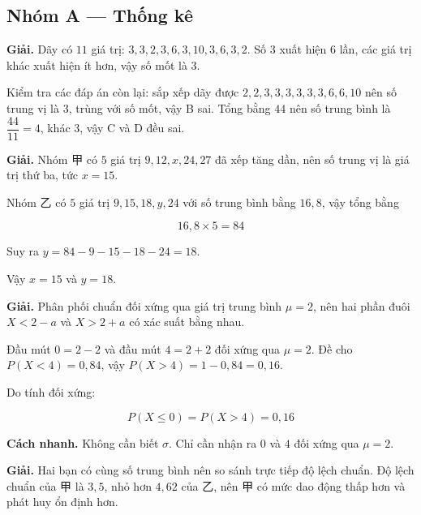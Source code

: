 \documentclass[11pt, a4paper]{article}
\begin{document}

\subsection*{Nhóm A — Thống kê}

\begin{dapan}[1 — Đáp án A]
\textbf{Giải.} Dãy có $11$ giá trị: $3, 3, 2, 3, 6, 3, 10, 3, 6, 3, 2$. Số $3$ xuất hiện $6$ lần, các giá trị khác xuất hiện ít hơn, vậy số mốt là $3$.

Kiểm tra các đáp án còn lại: sắp xếp dãy được $2, 2, 3, 3, 3, 3, 3, 3, 6, 6, 10$ nên số trung vị là $3$, trùng với số mốt, vậy B sai. Tổng bằng $44$ nên số trung bình là $\dfrac{44}{11} = 4$, khác $3$, vậy C và D đều sai.
\end{dapan}

\begin{dapan}[2 — Đáp án A]
\textbf{Giải.} Nhóm 甲 có $5$ giá trị $9, 12, x, 24, 27$ đã xếp tăng dần, nên số trung vị là giá trị thứ ba, tức $x = 15$.

Nhóm 乙 có $5$ giá trị $9, 15, 18, y, 24$ với số trung bình bằng $16{,}8$, vậy tổng bằng

$$16{,}8 \times 5 = 84$$

Suy ra $y = 84 - 9 - 15 - 18 - 24 = 18$.

Vậy $x = 15$ và $y = 18$.
\end{dapan}

\begin{dapan}[3 — Đáp án A]
\textbf{Giải.} Phân phối chuẩn đối xứng qua giá trị trung bình $\mu = 2$, nên hai phần đuôi $X < 2 - a$ và $X > 2 + a$ có xác suất bằng nhau.

Đầu mút $0 = 2 - 2$ và đầu mút $4 = 2 + 2$ đối xứng qua $\mu = 2$. Đề cho $P(X < 4) = 0{,}84$, vậy $P(X > 4) = 1 - 0{,}84 = 0{,}16$.

Do tính đối xứng:

$$P(X \le 0) = P(X > 4) = 0{,}16$$

\textbf{Cách nhanh.} Không cần biết $\sigma$. Chỉ cần nhận ra $0$ và $4$ đối xứng qua $\mu = 2$.
\end{dapan}

\begin{dapan}[4 — Đáp án A]
\textbf{Giải.} Hai bạn có cùng số trung bình nên so sánh trực tiếp độ lệch chuẩn. Độ lệch chuẩn của 甲 là $3{,}5$, nhỏ hơn $4{,}62$ của 乙, nên 甲 có mức dao động thấp hơn và phát huy ổn định hơn.
\end{dapan}
\end{document}
